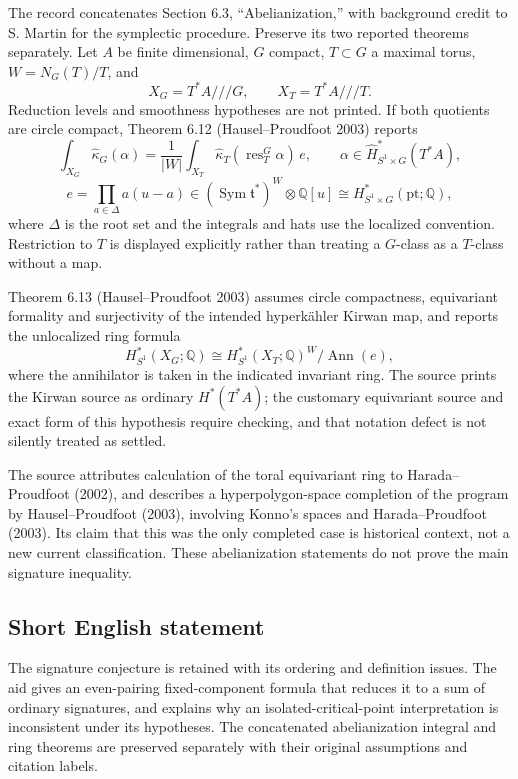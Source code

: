 \documentclass[11pt]{article}
\begin{document}
The record concatenates Section 6.3, ``Abelianization,'' with background credit to S. Martin for the symplectic procedure. Preserve its two reported theorems separately. Let \(A\) be finite dimensional, \(G\) compact, \(T\subset G\) a maximal torus, \(W=N_G(T)/T\), and
\[
 X_G=T^*A\mathbin{/\!/\!/}G,\qquad
 X_T=T^*A\mathbin{/\!/\!/}T.
\]
Reduction levels and smoothness hypotheses are not printed. If both quotients are circle compact, Theorem 6.12 (Hausel--Proudfoot 2003) reports
\[
 \int_{X_G}\widehat\kappa_G(\alpha)
 =\frac1{|W|}\int_{X_T}
       \widehat\kappa_T(\operatorname{res}^G_T\alpha)\,e,
 \qquad \alpha\in\widehat H^*_{S^1\times G}(T^*A),
\]
\[
 e=\prod_{a\in\Delta}a(u-a)
 \in(\operatorname{Sym}\mathfrak t^*)^W\otimes\mathbb Q[u]
 \cong H^*_{S^1\times G}(\mathrm{pt};\mathbb Q),
\]
where \(\Delta\) is the root set and the integrals and hats use the localized convention. Restriction to \(T\) is displayed explicitly rather than treating a \(G\)-class as a \(T\)-class without a map.

Theorem 6.13 (Hausel--Proudfoot 2003) assumes circle compactness, equivariant formality and surjectivity of the intended hyperk\"ahler Kirwan map, and reports the unlocalized ring formula
\[
 H^*_{S^1}(X_G;\mathbb Q)
 \cong H^*_{S^1}(X_T;\mathbb Q)^W/\operatorname{Ann}(e),
\]
where the annihilator is taken in the indicated invariant ring. The source prints the Kirwan source as ordinary \(H^*(T^*A)\); the customary equivariant source and exact form of this hypothesis require checking, and that notation defect is not silently treated as settled.

The source attributes calculation of the toral equivariant ring to Harada--Proudfoot (2002), and describes a hyperpolygon-space completion of the program by Hausel--Proudfoot (2003), involving Konno's spaces and Harada--Proudfoot (2003). Its claim that this was the only completed case is historical context, not a new current classification. These abelianization statements do not prove the main signature inequality.
\subsection{Short English statement}
The signature conjecture is retained with its ordering and definition issues. The aid gives an even-pairing fixed-component formula that reduces it to a sum of ordinary signatures, and explains why an isolated-critical-point interpretation is inconsistent under its hypotheses. The concatenated abelianization integral and ring theorems are preserved separately with their original assumptions and citation labels.
\end{document}
